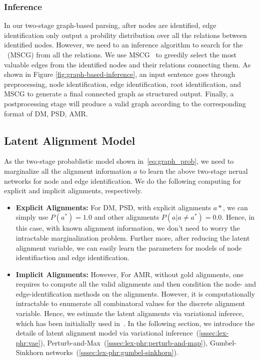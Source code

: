 \subsubsection{Inference}
\label{sssec:lex-phr:inference}
In our two-stage graph-based parsing, after nodes are identified, edge
identification only output a probility distribution over all the
relations between identified nodes. However, we need to an inference
algorithm to search for the ~(MSCG) from all the relations. We use
MSCG~\citep{Flanigan:2014vc} to greedily select the most valuable
edges from the identified nodes and their relations connecting
them. As shown in Figure \ref{fig:graph-based-inference}, an input
sentence goes through preprocessing, node identification, edge
identification, root identification, and MSCG to generate a final
connected graph as structured output. Finally, a postprocessing stage
will produce a valid graph according to the corresponding format of
DM, PSD, AMR.

\subsection{Latent Alignment Model}
\label{ssec:lex-phr:latent-alignment}

As the two-stage probablistic model shown
in~\autoref{eq:graph_prob}, we need to marginalize all the
alignment information $a$ to learn the above two-stage nerual networks
for node and edge identification. We do the following computing for
explicit and implicit alignments, respectively.
\begin{itemize}
\item \textbf{Explicit Alignments:} For DM, PSD, with explicit
  alignments $a*$, we can simply use $P(a^{*}) = 1.0$ and other
  alignments $P(a | a \neq a^{*}) = 0.0 $. Hence, in this case, with
  known alignment information, we don't need to worry the intractable
  marginalization problem. Further more, after reducing the latent
  alignment variable, we can easily learn the parameters for models of
  node identifiaction and edge identification.
\item \textbf{Implicit Alignments:} However, For AMR, without gold
  alignments, one requires to compute all the valid alignments and
  then condition the node- and edge-identification methods on the
  alignments.  However, it is computationally intractable to enumerate
  all combinatoral values for the discrete alignment variable. Hence,
  we estimate the latent alignments via variational inferece, which
  has been initialially used in~\citet{lyu2018amr}. In the following
  section, we introduce the details of latent alignment model via
  variational inference~(\autoref{sssec:lex-phr:vae}),
  Perturb-and-Max~(\autoref{sssec:lex-phr:perturb-and-map}), Gumbel-Sinkhorn
  networks~(\autoref{sssec:lex-phr:gumbel-sinkhorn}).
\end{itemize}

